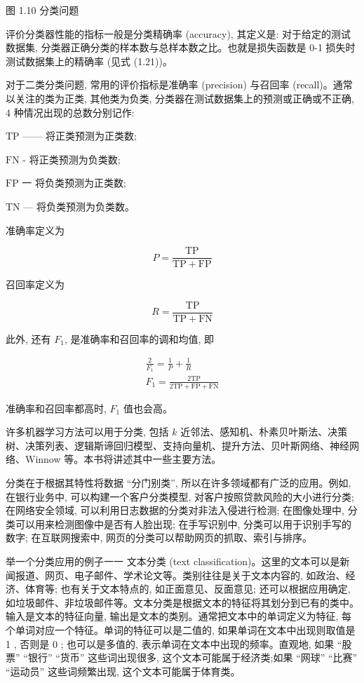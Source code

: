 \documentclass[10pt]{article}
\begin{document}
图 1.10 分类问题

评价分类器性能的指标一般是分类精确率 (accuracy), 其定义是: 对于给定的测试数据集, 分类器正确分类的样本数与总样本数之比。也就是损失函数是 0-1 损失时测试数据集上的精确率 (见式 (1.21))。

对于二类分类问题, 常用的评价指标是准确率 (precision) 与召回率 (recall)。通常以关注的类为正类, 其他类为负类, 分类器在测试数据集上的预测或正确或不正确, 4 种情况出现的总数分别记作:

$\mathrm{TP}$ —— 将正类预测为正类数;

$\mathrm{FN}$ - 将正类预测为负类数;

$\mathrm{FP}$ 一 将负类预测为正类数;

$\mathrm{TN}$ — 将负类预测为负类数。

准确率定义为


\begin{equation*}
P=\frac{\mathrm{TP}}{\mathrm{TP}+\mathrm{FP}} \tag{1.41}
\end{equation*}


召回率定义为


\begin{equation*}
R=\frac{\mathrm{TP}}{\mathrm{TP}+\mathrm{FN}} \tag{1.42}
\end{equation*}


此外, 还有 $F_{1}$, 是准确率和召回率的调和均值, 即


\begin{gather*}
\frac{2}{F_{1}}=\frac{1}{P}+\frac{1}{R}  \tag{1.43}\\
F_{1}=\frac{2 \mathrm{TP}}{2 \mathrm{TP}+\mathrm{FP}+\mathrm{FN}} \tag{1.44}
\end{gather*}


准确率和召回率都高时, $F_{1}$ 值也会高。

许多机器学习方法可以用于分类, 包括 $k$ 近邻法、感知机、朴素贝叶斯法、决策树、决策列表、逻辑斯谛回归模型、支持向量机、提升方法、贝叶斯网络、神经网络、Winnow 等。本书将讲述其中一些主要方法。

分类在于根据其特性将数据 “分门别类”, 所以在许多领域都有广泛的应用。例如, 在银行业务中, 可以构建一个客户分类模型, 对客户按照贷款风险的大小进行分类; 在网络安全领域, 可以利用日志数据的分类对非法入侵进行检测; 在图像处理中, 分类可以用来检测图像中是否有人脸出现; 在手写识别中, 分类可以用于识别手写的数字; 在互联网搜索中, 网页的分类可以帮助网页的抓取、索引与排序。

举一个分类应用的例子一一 文本分类 (text classification)。这里的文本可以是新闻报道、网页、电子邮件、学术论文等。类别往往是关于文本内容的, 如政治、经济、体育等; 也有关于文本特点的, 如正面意见、反面意见; 还可以根据应用确定, 如垃圾邮件、非垃圾邮件等。文本分类是根据文本的特征将其划分到已有的类中。输入是文本的特征向量, 输出是文本的类别。通常把文本中的单词定义为特征, 每个单词对应一个特征。单词的特征可以是二值的, 如果单词在文本中出现则取值是 1 , 否则是 0 ; 也可以是多值的, 表示单词在文本中出现的频率。直观地, 如果 “股票” “银行” “货币” 这些词出现很多, 这个文本可能属于经济类;如果 “网球” “比赛” “运动员” 这些词频繁出现, 这个文本可能属于体育类。
\end{document}
